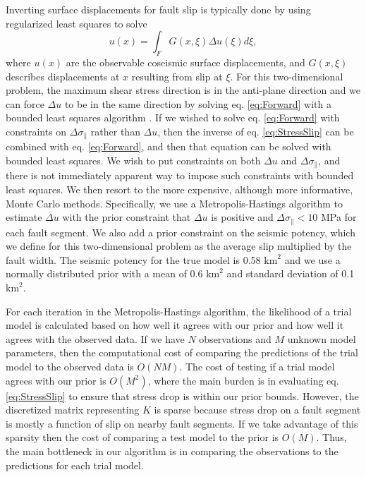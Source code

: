 \documentclass[12pt]{article}
\begin{document}
Inverting surface displacements for fault slip is typically done by using regularized least squares to solve
\begin{equation}\label{eq:Forward}
  u(x) = \int_F G(x,\xi) \Delta u(\xi) d\xi,
\end{equation}
where $u(x)$ are the observable coseismic surface displacements, and $G(x,\xi)$ describes displacements at $x$ resulting from slip at $\xi$.  For this two-dimensional problem, the maximum shear stress direction is in the anti-plane direction and we can force $\Delta u$ to be in the same direction by solving eq. \ref{eq:Forward} with a bounded least squares algorithm \citep{Lawson1995}.  If we wished to solve eq. \ref{eq:Forward} with constraints on $\Delta \sigma_\parallel$ rather than $\Delta u$, then the inverse of eq. \ref{eq:StressSlip} can be combined with eq. \ref{eq:Forward}, and then that equation can be solved with bounded least squares. We wish to put constraints on both $\Delta u$ and $\Delta \sigma_\parallel$, and there is not immediately apparent way to impose such constraints with bounded least squares.  We then resort to the more expensive, although more informative, Monte Carlo methods.  Specifically, we use a Metropolis-Hastings algorithm to estimate $\Delta u$ with the prior constraint that $\Delta u$ is positive and $\Delta \sigma_\parallel < 10$ MPa for each fault segment.  We also add a prior constraint on the seismic potency, which we define for this two-dimensional problem as the average slip multiplied by the fault width.  The seismic potency for the true model is 0.58 $\mathrm{km}^2$ and we use a normally distributed prior with a mean of 0.6 $\mathrm{km}^2$ and standard deviation of 0.1 $\mathrm{km}^2$.  

For each iteration in the Metropolis-Hastings algorithm, the likelihood of a trial model is calculated based on how well it agrees with our prior and how well it agrees with the observed data.  If we have $N$ observations and $M$ unknown model parameters, then the computational cost of comparing the predictions of the trial model to the observed data is $O(NM)$. The cost of testing if a trial model agrees with our prior is $O(M^2)$, where the main burden is in evaluating eq. \ref{eq:StressSlip} to ensure that stress drop is within our prior bounds.  However, the discretized matrix representing $K$ is sparse because stress drop on a fault segment is mostly a function of slip on nearby fault segments.  If we take advantage of this sparsity then the cost of comparing a test model to the prior is $O(M)$.  Thus, the main bottleneck in our algorithm is in comparing the observations to the predictions for each trial model. 
\end{document}
